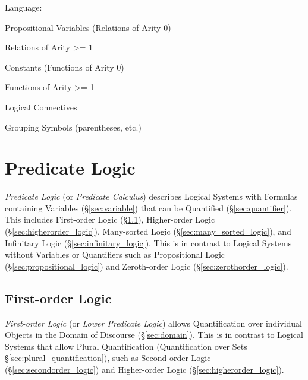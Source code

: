 
Language:

Propositional Variables (Relations of Arity 0)

Relations of Arity >= 1

Constants (Functions of Arity 0)

Functions of Arity >= 1

Logical Connectives

Grouping Symbols (parentheses, etc.)



\section{Predicate Logic}\label{sec:predicate_logic}

\emph{Predicate Logic} (or \emph{Predicate Calculus}) describes
Logical Systems with Formulas containing Variables
(\S\ref{sec:variable}) that can be Quantified
(\S\ref{sec:quantifier}). This includes First-order Logic
(\S\ref{sec:firstorder_logic}), Higher-order Logic
(\S\ref{sec:higherorder_logic}), Many-sorted Logic
(\S\ref{sec:many_sorted_logic}), and Infinitary Logic
(\S\ref{sec:infinitary_logic}). This is in contrast to Logical Systems
without Variables or Quantifiers such as Propositional Logic
(\S\ref{sec:propositional_logic}) and Zeroth-order Logic
(\S\ref{sec:zerothorder_logic}).



\subsection{First-order Logic}\label{sec:firstorder_logic}


\emph{First-order Logic} (or \emph{Lower Predicate Logic}) allows
Quantification over individual Objects in the Domain of Discourse
(\S\ref{sec:domain}). This is in contrast to Logical Systems that
allow Plural Quantification (Quantification over Sets
\S\ref{sec:plural_quantification}), such as Second-order Logic
(\S\ref{sec:secondorder_logic}) and Higher-order Logic
(\S\ref{sec:higherorder_logic}).

